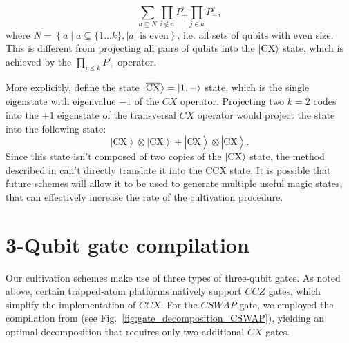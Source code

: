 \documentclass[twocolumn,notitlepage,nofootinbib,floatfix,superscriptaddress]{revtex4-1}
\begin{document}
\begin{equation}
\sum_{a\subseteq N}\prod_{i\notin a}P_{+}^{i}\prod_{j\in a}P_{-}^{j},
\end{equation}
where $N=\left\{ a\mid a\subseteq\{1...k\},\left|a\right|\text{ is even}\right\}$, i.e. all  sets of qubits with even size. This is different from projecting all pairs of qubits into the $\ket{\text{CX}}$ state, which is achieved by the $\prod_{i\le k}P_{+}^{i}$ operator. 

More explicitly, define the state $\ket{\overline{\text{CX}}}=\ket{1,-}$ state, which is the single eigenstate with eigenvalue $-1$ of the $CX$ operator. Projecting two $k=2$ codes into the $+1$ eigenstate of the transversal $CX$ operator would project the state into the following state:
\begin{equation}
\left|\text{CX}\right>\otimes\left|\text{CX}\right>+\left|\overline{\text{CX}}\right>\otimes\left|\overline{\text{CX}}\right>.
\end{equation}
Since this state isn't composed of two copies of the $\ket{\text{CX}}$ state, the method described in \cite{dennis2001toward} can't directly translate it into the CCX state. It is possible that future schemes will allow it to be used to generate multiple useful magic states, that can effectively increase the rate of the cultivation procedure. 

\section{3-Qubit gate compilation}
\label{3qubit_gate_compilation}
Our cultivation schemes make use of three types of three-qubit gates. As noted above, certain trapped-atom platforms natively support $CCZ$ gates, which simplify the implementation of $CCX$. For the $CSWAP$ gate, we employed the compilation from \cite{gouzien2025provably} (see Fig.~\ref{fig:gate_decomposition_CSWAP}), yielding an optimal decomposition that requires only two additional $CX$ gates.
\end{document}
